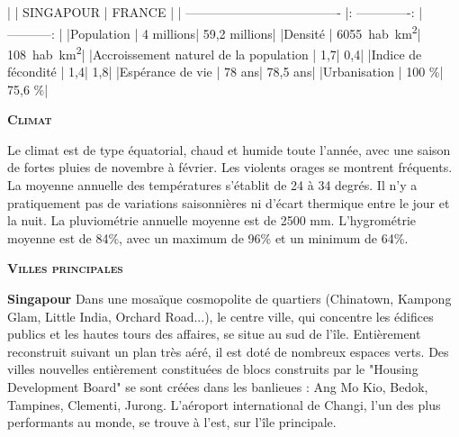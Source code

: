 \begin{multicols}{2}
|                                       |     SINGAPOUR   |    FRANCE    |
| ------------------------------------- |: -------------: | -----------: |
|Population                             |       4 millions| 59,2 millions|
|Densité                                |     \SI{6055}{hab.km^2}|   \SI{108}{hab.km^2}|
|Accroissement naturel de la population |              1,7|           0,4|
|Indice de fécondité                    |              1,4|           1,8|
|Espérance de vie                       |           78 ans|      78,5 ans|
|Urbanisation                           |            100 \%|        75,6 \%|

\textbf{\textsc{Climat}}

Le climat est de type équatorial, chaud et humide toute l'année, avec une saison de fortes pluies de novembre à février. Les violents orages se montrent fréquents. La moyenne annuelle des températures s'établit de 24 à 34 degrés. Il n'y a pratiquement pas de variations saisonnières ni d'écart thermique entre le jour et la nuit. La pluviométrie annuelle moyenne est de 2500 mm. L'hygrométrie moyenne est de 84\%, avec un maximum de 96\% et un minimum de 64\%.

\textbf{\textsc{Villes principales}}

\textbf{Singapour}
Dans une mosaïque cosmopolite de quartiers (Chinatown, Kampong Glam, Little India, Orchard Road...), le centre ville, qui concentre les édifices publics et les hautes tours des affaires, se situe au sud de l'île. Entièrement reconstruit suivant un plan très aéré, il est doté de nombreux espaces verts. Des villes nouvelles entièrement constituées de blocs construits par le "Housing Development Board" se sont créées dans les banlieues : Ang Mo Kio, Bedok, Tampines, Clementi, Jurong. L'aéroport international de Changi, l'un des plus performants au monde, se trouve à l'est, sur l'île principale.

\end{multicols}
